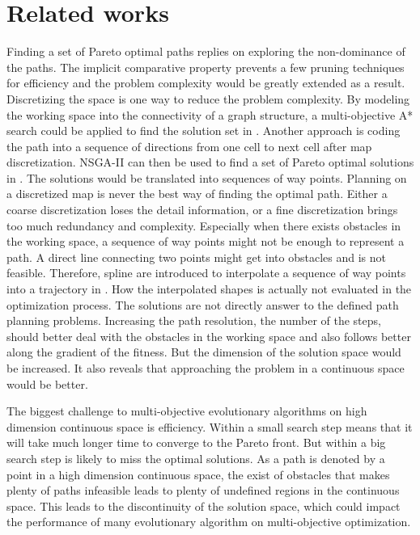 \documentclass[conference]{IEEEtran}
\begin{document}
\section{Related works}
\label{sec:related_works}

Finding a set of Pareto optimal paths replies on exploring the non-dominance of the paths.
The implicit comparative property prevents a few pruning techniques for efficiency and the problem complexity would be greatly extended as a result.
Discretizing the space is one way to reduce the problem complexity.
By modeling the working space into the connectivity of a graph structure, a multi-objective A* search could be applied to find the solution set in \cite{Mandow:2005:NAM:1642293.1642328}.
Another approach is coding the path into a sequence of directions from one cell to next cell after map discretization.
NSGA-II can then be used to find a set of Pareto optimal solutions in \cite{Ahmed2013}.
The solutions would be translated into sequences of way points.
Planning on a discretized map is never the best way of finding the optimal path.
Either a coarse discretization loses the detail information, or a fine discretization brings too much redundancy and complexity.
Especially when there exists obstacles in the working space, a sequence of way points might not be enough to represent a path.
A direct line connecting two points might get into obstacles and is not feasible.  
Therefore, spline are introduced to interpolate a sequence of way points into a trajectory in \cite{6181426}.
How the interpolated shapes is actually not evaluated in the optimization process. 
The solutions are not directly answer to the defined path planning problems.
Increasing the path resolution, the number of the steps, should better deal with the obstacles in the working space and also follows better along the gradient of the fitness.
But the dimension of the solution space would be increased.
It also reveals that approaching the problem in a continuous space would be better.

The biggest challenge to multi-objective evolutionary algorithms on high dimension continuous space is efficiency.
Within a small search step means that it will take much longer time to converge to the Pareto front.
But within a big search step is likely to miss the optimal solutions.
As a path is denoted by a point in a high dimension continuous space, the exist of obstacles that makes plenty of paths infeasible leads to plenty of undefined regions in the continuous space.
This leads to the discontinuity of the solution space, which could impact the performance of many evolutionary algorithm on multi-objective optimization.
\end{document}
